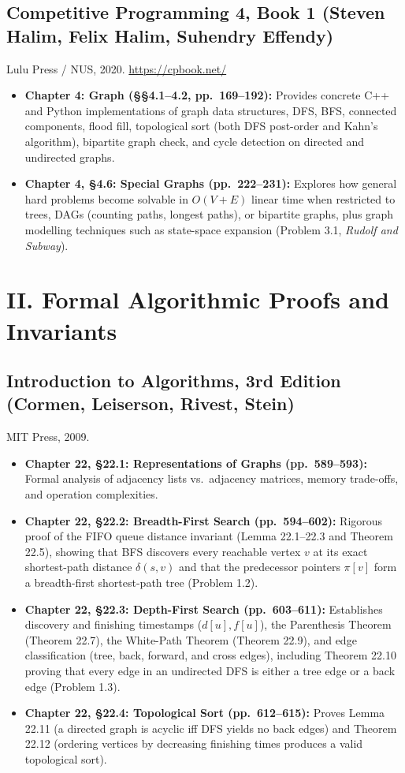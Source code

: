 \documentclass[11pt]{article}
\begin{document}
\subsection*{Competitive Programming 4, Book 1 (Steven Halim, Felix Halim, Suhendry Effendy)}
Lulu Press / NUS, 2020. \url{https://cpbook.net/}

\begin{itemize}
    \item \textbf{Chapter 4: Graph (\S\S 4.1--4.2, pp.~169--192):}
    Provides concrete C++ and Python implementations of graph data structures, DFS, BFS, connected components, flood fill, topological sort (both DFS post-order and Kahn's algorithm), bipartite graph check, and cycle detection on directed and undirected graphs.
    \item \textbf{Chapter 4, \S 4.6: Special Graphs (pp.~222--231):}
    Explores how general hard problems become solvable in $O(V + E)$ linear time when restricted to trees, DAGs (counting paths, longest paths), or bipartite graphs, plus graph modelling techniques such as state-space expansion (Problem 3.1, \emph{Rudolf and Subway}).
\end{itemize}

\section*{II. Formal Algorithmic Proofs and Invariants}

\subsection*{Introduction to Algorithms, 3rd Edition (Cormen, Leiserson, Rivest, Stein)}
MIT Press, 2009.

\begin{itemize}
    \item \textbf{Chapter 22, \S 22.1: Representations of Graphs (pp.~589--593):}
    Formal analysis of adjacency lists vs.\ adjacency matrices, memory trade-offs, and operation complexities.
    \item \textbf{Chapter 22, \S 22.2: Breadth-First Search (pp.~594--602):}
    Rigorous proof of the FIFO queue distance invariant (Lemma 22.1--22.3 and Theorem 22.5), showing that BFS discovers every reachable vertex $v$ at its exact shortest-path distance $\delta(s, v)$ and that the predecessor pointers $\pi[v]$ form a breadth-first shortest-path tree (Problem 1.2).
    \item \textbf{Chapter 22, \S 22.3: Depth-First Search (pp.~603--611):}
    Establishes discovery and finishing timestamps ($d[u], f[u]$), the Parenthesis Theorem (Theorem 22.7), the White-Path Theorem (Theorem 22.9), and edge classification (tree, back, forward, and cross edges), including Theorem 22.10 proving that every edge in an undirected DFS is either a tree edge or a back edge (Problem 1.3).
    \item \textbf{Chapter 22, \S 22.4: Topological Sort (pp.~612--615):}
    Proves Lemma 22.11 (a directed graph is acyclic iff DFS yields no back edges) and Theorem 22.12 (ordering vertices by decreasing finishing times produces a valid topological sort).
\end{itemize}
\end{document}
